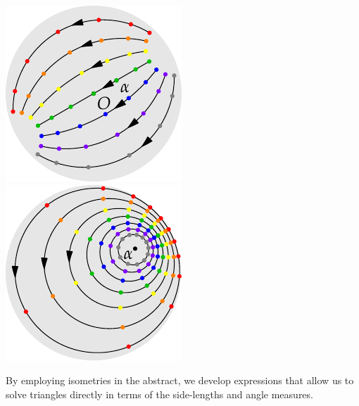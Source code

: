 \begin{minipage}[t]{0.24\linewidth}\vspace{-3pt}
	\flushright\includegraphics[scale=0.95]{isom-trans}\\
	\includegraphics[scale=0.95]{isom-rotate}
\end{minipage}

\goodbreak




By employing isometries in the abstract, we develop expressions that allow us to solve triangles directly in terms of the side-lengths and angle measures.



